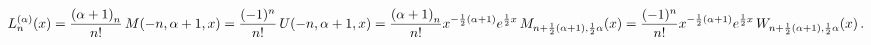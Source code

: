 \[\mathop{L^{(\alpha)}_{n}\/}\nolimits\!\left(x\right)=\frac{\left(\alpha+1%
\right)_{n}}{n!}\mathop{M\/}\nolimits\!\left(-n,\alpha+1,x\right)=\frac{(-1)^{%
n}}{n!}\mathop{U\/}\nolimits\!\left(-n,\alpha+1,x\right)=\frac{\left(\alpha+1%
\right)_{n}}{n!}x^{-\frac{1}{2}(\alpha+1)}e^{\frac{1}{2}x}\mathop{M_{n+\frac{1%
}{2}(\alpha+1),\frac{1}{2}\alpha}\/}\nolimits\!\left(x\right)=\frac{(-1)^{n}}{%
n!}x^{-\frac{1}{2}(\alpha+1)}e^{\frac{1}{2}x}\mathop{W_{n+\frac{1}{2}(\alpha+1%
),\frac{1}{2}\alpha}\/}\nolimits\!\left(x\right).\]
